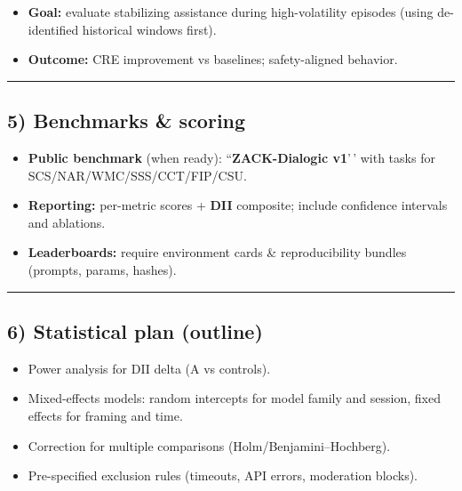 \documentclass{article}
\begin{document}
\begin{itemize}
\item
  \textbf{Goal:} evaluate stabilizing assistance during high-volatility episodes (using de-identified historical windows first).
\item
  \textbf{Outcome:} CRE improvement vs baselines; safety-aligned behavior.
\end{itemize}

\begin{center}\rule{0.5\linewidth}{0.5pt}\end{center}

\subsection*{5) Benchmarks \& scoring}\label{benchmarks-scoring}

\begin{itemize}
\item
  \textbf{Public benchmark} (when ready): ``\textbf{ZACK-Dialogic v1}'\,' with tasks for SCS/NAR/WMC/SSS/CCT/FIP/CSU.
\item
  \textbf{Reporting:} per-metric scores + \textbf{DII} composite; include confidence intervals and ablations.
\item
  \textbf{Leaderboards:} require environment cards \& reproducibility bundles (prompts, params, hashes).
\end{itemize}

\begin{center}\rule{0.5\linewidth}{0.5pt}\end{center}

\subsection*{6) Statistical plan (outline)}\label{statistical-plan-outline}

\begin{itemize}
\item
  Power analysis for DII delta (A vs controls).
\item
  Mixed-effects models: random intercepts for model family and session, fixed effects for framing and time.
\item
  Correction for multiple comparisons (Holm/Benjamini--Hochberg).
\item
  Pre-specified exclusion rules (timeouts, API errors, moderation blocks).
\end{itemize}
\end{document}
